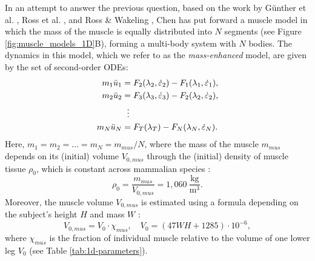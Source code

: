 \documentclass{sfuthesis}
\numberwithin{equation}{chapter}
\numberwithin{figure}{chapter}
\numberwithin{table}{chapter}
\theoremstyle{definition}
\newcommand{\depsilon}{\dot{\varepsilon}}
\begin{document}
In an attempt to answer the previous question, based on the work by G\"{u}nther et al. \cite{Gunther2012}, Ross et al. \cite{Ross2018}, and Ross \& Wakeling \cite{RossWakeling2016Multibody, RossPaper4}, Chen \cite{EvanThesis} has put forward a muscle model in which the mass of the muscle is equally distributed into $N$ segments (see Figure \ref{fig:muscle_models_1D}B), forming a multi-body system with $N$ bodies. The dynamics in this model, which we refer to as the \textit{mass-enhanced} model, are given by the set of second-order ODEs:
\begin{subequations} \label{eq:massenhanced_model}
    \begin{align}
        m_1 \ddot{u}_1 &= F_2(\lambda_2, \depsilon_2) - F_1(\lambda_1, \depsilon_1), \\
        m_2 \ddot{u}_2 &= F_3(\lambda_3, \depsilon_3) - F_2(\lambda_2, \depsilon_2), \\
        &\hspace{0.6em} \vdots \notag \\
        m_N \ddot{u}_N &= F_T(\lambda_T) - F_N(\lambda_N, \depsilon_N).
    \end{align}
\end{subequations}
Here, $m_1 = m_2 = \dots = m_N = m_{mus}/N$, where the mass of the muscle $m_{mus}$ depends on its (initial) volume $V_{0,mus}$ through the (initial) density of muscle tissue $\rho_0$, which is constant across mammalian species \cite{MendezKeys1960}:
\begin{equation}
    \rho_0 = \dfrac{m_{mus}}{V_{0,mus}} = 1,060 \ \dfrac{\text{kg}}{\text{m}^3}.
\end{equation}
Moreover, the muscle volume $V_{0,mus}$ is estimated using a formula depending on the subject's height $H$ and mass $W$ \cite{Hansfield2014}:
\begin{equation}
    V_{0,mus} = V_0 \cdot \chi_{mus}, \quad V_0 = (47WH + 1285) \cdot 10^{-6},
\end{equation}
where $\chi_{mus}$ is the fraction of individual muscle relative to the volume of one lower leg $V_0$ (see Table \ref{tab:1d-parameters}).
\end{document}
